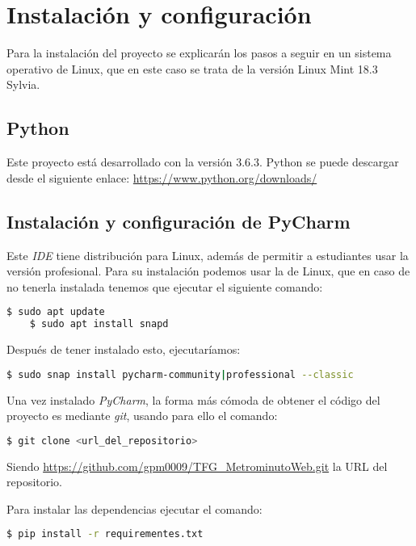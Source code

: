 \section{Instalación y configuración}
Para la instalación del proyecto se explicarán los pasos a seguir en un sistema operativo de Linux, que en este caso se trata de la versión Linux Mint 18.3 Sylvia.

\subsection{Python}

Este proyecto está desarrollado con la versión 3.6.3. Python se puede descargar desde el siguiente enlace: 
\url{https://www.python.org/downloads/}

\subsection{Instalación y configuración de PyCharm}
Este \textit{IDE} tiene distribución para Linux, además de permitir a estudiantes usar la versión profesional. Para su instalación podemos usar la \cite{snap store} de Linux, que en caso de no tenerla instalada tenemos que ejecutar el siguiente comando:

\begin{lstlisting}[language=bash,caption={Instalar snapd}]
	$ sudo apt update
	$ sudo apt install snapd
\end{lstlisting}
Después de tener instalado esto, ejecutaríamos:
\begin{lstlisting}[language=bash,caption={Instalar PyCharm}]
	$ sudo snap install pycharm-community|professional --classic
\end{lstlisting}

Una vez instalado \textit{PyCharm}, la forma más cómoda de obtener el código del proyecto es mediante \textit{git}, usando para ello el comando:
\begin{lstlisting}[language=bash,caption={Descargar el repositorio}]
	$ git clone <url_del_repositorio>
\end{lstlisting}
Siendo \url{https://github.com/gpm0009/TFG_MetrominutoWeb.git} la URL del 
repositorio.

Para instalar las dependencias ejecutar el comando:
\begin{lstlisting}[language=bash,caption={Instalar requirements.txt}]
	$ pip install -r requirementes.txt
\end{lstlisting}


